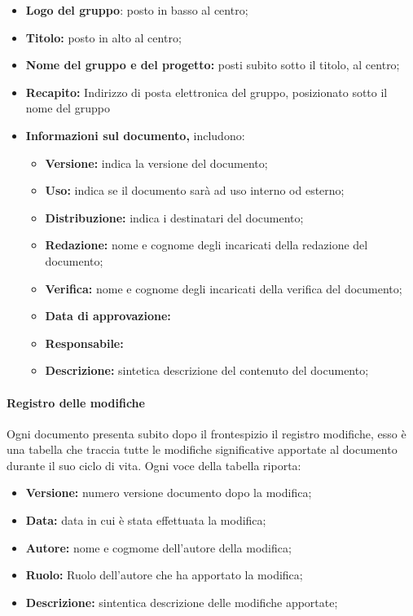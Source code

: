\begin{itemize}

	\item \textbf{Logo del gruppo}: posto in basso al centro;
	\item \textbf{Titolo:} posto in alto al centro;
	\item \textbf{Nome del gruppo e del progetto:} posti subito sotto il titolo, al centro;
	\item \textbf{Recapito:} Indirizzo di posta elettronica del gruppo, posizionato sotto il nome del gruppo
	\item \textbf{Informazioni sul documento,} includono:
	
	\begin{itemize}
		\item \textbf{Versione:} indica la versione del documento;
		\item \textbf{Uso:} indica se il documento sarà ad uso interno od esterno;
		\item \textbf{Distribuzione:} indica i destinatari del documento;
		\item \textbf{Redazione:} nome e cognome degli incaricati della redazione del documento;
		\item \textbf{Verifica:} nome e cognome degli incaricati della verifica del documento;
		\item \textbf{Data di approvazione:}
		\item \textbf{Responsabile:}
		\item \textbf{Descrizione:} sintetica descrizione del contenuto del documento;
	\end{itemize}

\end{itemize}

\paragraph{Registro delle modifiche}

Ogni documento presenta subito dopo il frontespizio il registro modifiche, esso è una tabella che traccia tutte le modifiche significative apportate al documento durante il suo ciclo di vita. Ogni voce della tabella riporta:

\begin{itemize}
	\item \textbf{Versione:} numero versione documento dopo la modifica;
	\item \textbf{Data:} data in cui è stata effettuata la modifica;
	\item \textbf{Autore:} nome e cogmome dell'autore della modifica;
	\item \textbf{Ruolo:} Ruolo dell'autore che ha apportato la modifica;
	\item \textbf{Descrizione:} sintentica descrizione delle modifiche apportate;
\end{itemize}

